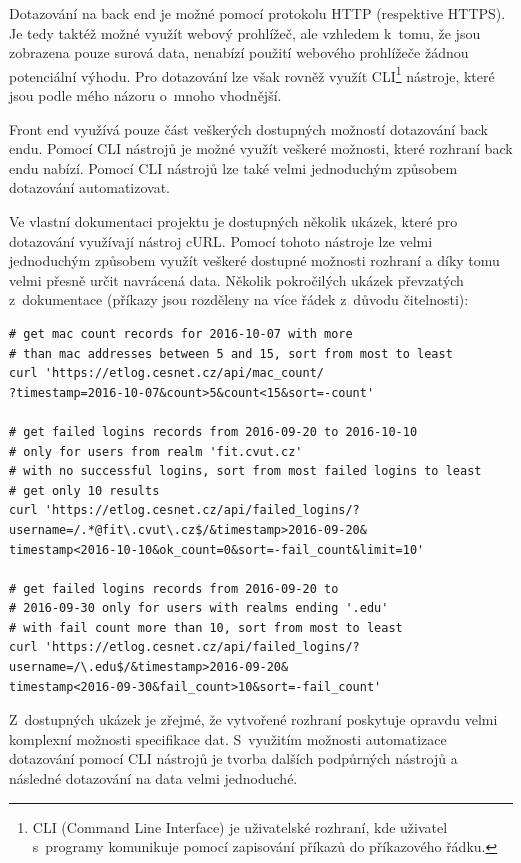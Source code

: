 \documentclass[thesis=M,czech]{FITthesis}[2012/06/26]
\begin{document}
    Dotazování na back end je možné pomocí protokolu HTTP (respektive HTTPS).
    Je tedy taktéž možné využít webový prohlížeč, 
    ale vzhledem k~tomu, že jsou zobrazena pouze surová data,
    nenabízí použití webového prohlížeče žádnou potenciální výhodu.
    Pro dotazování lze však rovněž využít CLI\footnote{
      CLI (Command Line Interface) je uživatelské rozhraní, kde uživatel 
      s~programy komunikuje pomocí zapisování příkazů do příkazového řádku.  
    }
    nástroje, které jsou podle mého názoru o~mnoho vhodnější.

    Front end využívá pouze část veškerých dostupných možností dotazování back endu.
    Pomocí CLI nástrojů je možné využít veškeré možnosti, které
    rozhraní back endu nabízí.
    Pomocí CLI nástrojů lze také velmi jednoduchým způsobem dotazování automatizovat.

    Ve vlastní dokumentaci projektu je dostupných několik ukázek,
    které pro dotazování využívají nástroj cURL.
    Pomocí tohoto nástroje lze velmi jednoduchým způsobem využít veškeré
    dostupné možnosti rozhraní a díky tomu velmi přesně určit navrácená data.
    Několik pokročilých ukázek převzatých z~dokumentace
    (příkazy jsou rozděleny na více řádek z~důvodu čitelnosti):

    \begin{verbatim}
# get mac count records for 2016-10-07 with more 
# than mac addresses between 5 and 15, sort from most to least
curl 'https://etlog.cesnet.cz/api/mac_count/
?timestamp=2016-10-07&count>5&count<15&sort=-count'

# get failed logins records from 2016-09-20 to 2016-10-10 
# only for users from realm 'fit.cvut.cz'
# with no successful logins, sort from most failed logins to least
# get only 10 results
curl 'https://etlog.cesnet.cz/api/failed_logins/?
username=/.*@fit\.cvut\.cz$/&timestamp>2016-09-20&
timestamp<2016-10-10&ok_count=0&sort=-fail_count&limit=10'

# get failed logins records from 2016-09-20 to 
# 2016-09-30 only for users with realms ending '.edu'
# with fail count more than 10, sort from most to least
curl 'https://etlog.cesnet.cz/api/failed_logins/?
username=/\.edu$/&timestamp>2016-09-20&
timestamp<2016-09-30&fail_count>10&sort=-fail_count'
    \end{verbatim}

    Z~dostupných ukázek je zřejmé, že vytvořené rozhraní poskytuje
    opravdu velmi komplexní možnosti specifikace dat.
    S~využitím možnosti automatizace dotazování pomocí CLI nástrojů
    je tvorba dalších podpůrných nástrojů a následné
    dotazování na data velmi jednoduché.
\end{document}
